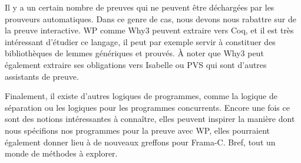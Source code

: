 Il y a un certain nombre de preuves qui ne peuvent être déchargées par les
prouveurs automatiques. Dans ce genre de cas, nous devons nous rabattre sur de la
preuve interactive. WP comme Why3 peuvent extraire vers Coq, et il est très
intéressant d'étudier ce langage, il peut par exemple servir à constituer des
bibliothèques de lemmes génériques et prouvés. À noter que Why3 peut également
extraire ses obligations vers Isabelle ou PVS qui sont d'autres assistants de
preuve.



Finalement, il existe d'autres logiques de programmes, comme la logique de
séparation ou les logiques pour les programmes concurrents. Encore une fois ce
sont des notions intéressantes à connaître, elles peuvent inspirer la manière dont
nous spécifions nos programmes pour la preuve avec WP, elles pourraient également
donner lieu à de nouveaux greffons pour Frama-C. Bref, tout un monde de méthodes à
explorer.
